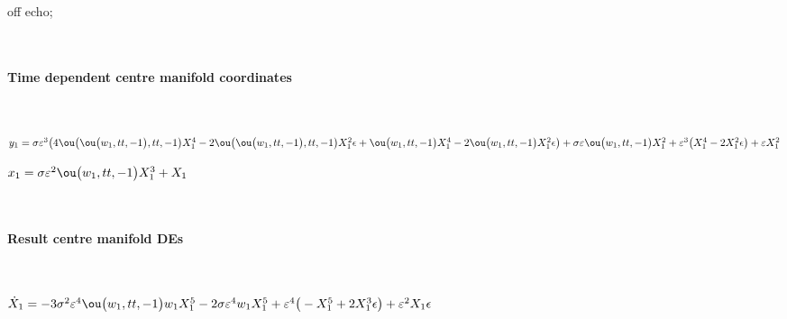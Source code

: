 \documentclass[11pt,a5paper]{article}
\begin{document}


off echo;


\(\)
\paragraph{Time dependent centre manifold coordinates}
\(
\)\par

\(y_{1}=\sigma  \eps^{3} \big(4 \ou\big(\ou\big(w_{1},tt,-1\big),tt,-1
\big) X_{1}^{4}-2 \ou\big(\ou\big(w_{1},tt,-1\big),tt,-1\big) X_{1}^{2} 
\epsilon +\ou\big(w_{1},tt,-1\big) X_{1}^{4}-2 \ou\big(w_{1},tt,-1\big) 
X_{1}^{2} \epsilon \big)+\sigma  \eps \ou\big(w_{1},tt,-1\big) X_{1}^{2}
+\eps^{3} \big(X_{1}^{4}-2 X_{1}^{2} \epsilon \big)+\eps X_{1}^{2}
\)\par

\(x_{1}=\sigma  \eps^{2} \ou\big(w_{1},tt,-1\big) X_{1}^{3}+X_{1}
\)\par

\(\)
\paragraph{Result centre manifold DEs}
\(
\)\par

\(\dot X_{1}=-3 \sigma ^{2} \eps^{4} \ou\big(w_{1},tt,-1\big) w_{1} X_{1}
^{5}-2 \sigma  \eps^{4} w_{1} X_{1}^{5}+\eps^{4} \big(-X_{1}^{5}+2 X_{1}
^{3} \epsilon \big)+\eps^{2} X_{1} \epsilon 
\)\par
\end{document}
